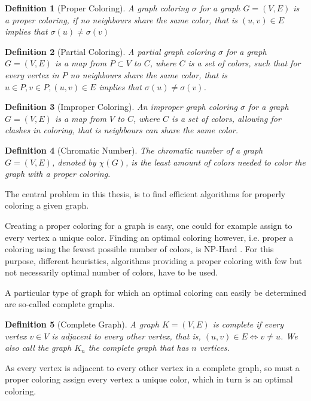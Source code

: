 \documentclass[a4paper]{article}
\newtheorem{definition}{Definition}[section]
\begin{document}
\begin{definition}[Proper Coloring]
    A graph coloring $\sigma$ for a graph $G = (V,E)$ is a proper coloring,
    if no neighbours share the same color,
    that is $(u,v) \in E$ implies that $\sigma(u) \neq \sigma(v)$
\end{definition}

\begin{definition}[Partial Coloring]{\cite{Constructive}}
    A partial graph coloring $\sigma$ for a graph $G = (V,E)$ is a map from $P \subset V$ to $C$,
    where $C$ is a set of colors, such that for every vertex in $P$ no neighbours 
    share the same color, that is $u \in P,v \in P, (u,v) \in E$  implies that $\sigma(u) \neq \sigma(v)$.
\end{definition}
\begin{definition}[Improper Coloring]{\cite{Constructive}}
    An improper graph coloring $\sigma$ for a graph $G = (V,E)$ is a map from
    $V$ to $C$, where $C$ is a set of colors, allowing for clashes in coloring,
    that is neighbours can share the same color.
\end{definition}
\begin{definition}[Chromatic Number]
    The chromatic number of a graph $G = (V,E)$, denoted by $\chi(G)$, is the
    least amount of colors needed to color the graph with a proper coloring.
\end{definition}
The central problem in this thesis, is to find efficient algorithms 
for properly coloring a given graph.

Creating a proper coloring for a graph is easy, one could for example assign to
every vertex a unique color. Finding an optimal coloring however, i.e. proper a
coloring using the fewest possible number of colors, is NP-Hard \cite{NPHard}.
For this purpose, different heuristics, algorithms providing a proper coloring
with few but not necessarily optimal number of colors, have to be used.

A particular type of graph for which an optimal coloring can easily be determined 
are so-called complete graphs.
\begin{definition}[Complete Graph]
    A graph $K = (V,E)$ is complete if every vertex $v \in V$ is adjacent to
    every other vertex, that is, $ (u,v) \in E \iff v \neq u$. We also call the
    graph $K_n$ the complete graph that has $n$ vertices.
\end{definition}
As every vertex is adjacent to every other vertex in a complete graph, so must a proper coloring
assign every vertex a unique color, which in turn is an optimal coloring.
\end{document}

